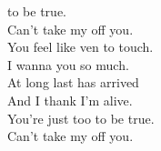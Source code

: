   to be true. \\
\songwordfb{} Can't take my  off you. \\
\songwordfb{} You feel like ven to touch. \\
\songwordfb{} I wanna  you so much. \\
\songwordfb{} At long last  has arrived \\
\songwordfb{} And I thank  I'm alive. \\
\songwordfb{} You're just too  to be true.\\
\songwordfb{} Can't take my  off you. 
\songwordfb{} \\
